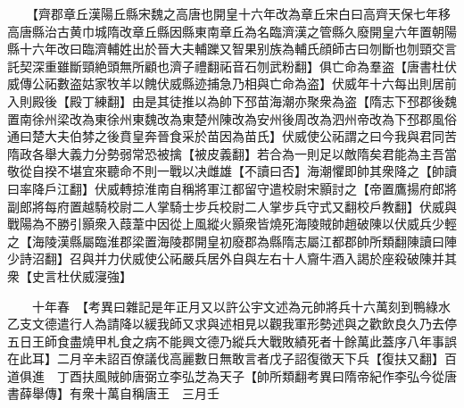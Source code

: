 　　【齊郡章丘漢陽丘縣宋魏之高唐也開皇十六年改為章丘宋白曰高齊天保七年移高唐縣治古黄巾城隋改章丘縣因縣東南章丘為名臨濟漢之管縣久廢開皇六年置朝陽縣十六年改曰臨濟輔姓出於晉大夫輔躒又智果别族為輔氏顔師古曰刎斷也刎頸交言託契深重雖斷頸絶頭無所顧也濟子禮翻祏音石刎武粉翻】俱亡命為羣盗【唐書杜伏威傳公祏數盗姑家牧羊以餽伏威縣迹捕急乃相與亡命為盗】伏威年十六每出則居前入則殿後【殿丁練翻】由是其徒推以為帥下邳苗海潮亦聚衆為盗【隋志下邳郡後魏置南徐州梁改為東徐州東魏改為東楚州陳改為安州後周改為泗州帝改為下邳郡風俗通曰楚大夫伯棼之後賁皇奔晉食采於苗因為苗氏】伏威使公祏謂之曰今我與君同苦隋政各舉大義力分勢弱常恐被擒【被皮義翻】若合為一則足以敵隋矣君能為主吾當敬從自揆不堪宜來聽命不則一戰以决雌雄【不讀曰否】海潮懼即帥其衆降之【帥讀曰率降戶江翻】伏威轉掠淮南自稱將軍江都留守遣校尉宋顥討之【帝置鷹揚府郎將副郎將每府置越騎校尉二人掌騎士步兵校尉二人掌步兵守式又翻校戶教翻】伏威與戰陽為不勝引顥衆入葭葦中因從上風縱火顥衆皆燒死海陵賊帥趙破陳以伏威兵少輕之【海陵漢縣屬臨淮郡梁置海陵郡開皇初廢郡為縣隋志屬江都郡帥所類翻陳讀曰陣少詩沼翻】召與并力伏威使公祏嚴兵居外自與左右十人齎牛酒入謁於座殺破陳并其衆【史言杜伏威寖強】

　　十年春　【考異曰雜記是年正月又以許公宇文述為元帥將兵十六萬刻到鴨綠水乙支文德遣行人為請降以緩我師又求與述相見以觀我軍形勢述與之歡飲良久乃去停五日王師食盡燒甲札食之病不能興文德乃縱兵大戰敗績死者十餘萬此蓋序八年事誤在此耳】二月辛未詔百僚議伐高麗數日無敢言者戊子詔復徵天下兵【復扶又翻】百道俱進　丁酉扶風賊帥唐弼立李弘芝為天子【帥所類翻考異曰隋帝紀作李弘今從唐書薛舉傳】有衆十萬自稱唐王　三月壬

